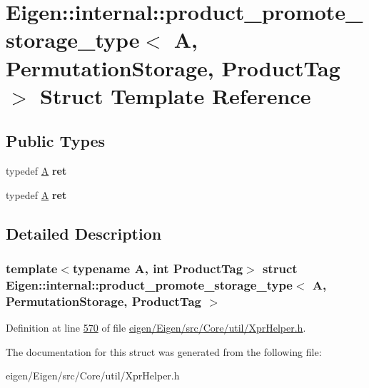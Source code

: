 \hypertarget{struct_eigen_1_1internal_1_1product__promote__storage__type_3_01_a_00_01_permutation_storage_00_01_product_tag_01_4}{}\section{Eigen\+:\+:internal\+:\+:product\+\_\+promote\+\_\+storage\+\_\+type$<$ A, Permutation\+Storage, Product\+Tag $>$ Struct Template Reference}
\label{struct_eigen_1_1internal_1_1product__promote__storage__type_3_01_a_00_01_permutation_storage_00_01_product_tag_01_4}
\subsection*{Public Types}
\begin{DoxyCompactItemize}
\item 
\mbox{\label{struct_eigen_1_1internal_1_1product__promote__storage__type_3_01_a_00_01_permutation_storage_00_01_product_tag_01_4_a01c2d9f17207b5b2a3bf0ed9826523a6}} 
typedef \hyperlink{group___core___module_class_eigen_1_1_matrix}{A} {\bfseries ret}
\item 
\mbox{\label{struct_eigen_1_1internal_1_1product__promote__storage__type_3_01_a_00_01_permutation_storage_00_01_product_tag_01_4_a01c2d9f17207b5b2a3bf0ed9826523a6}} 
typedef \hyperlink{group___core___module_class_eigen_1_1_matrix}{A} {\bfseries ret}
\end{DoxyCompactItemize}


\subsection{Detailed Description}
\subsubsection*{template$<$typename A, int Product\+Tag$>$\newline
struct Eigen\+::internal\+::product\+\_\+promote\+\_\+storage\+\_\+type$<$ A, Permutation\+Storage, Product\+Tag $>$}



Definition at line \hyperlink{eigen_2_eigen_2src_2_core_2util_2_xpr_helper_8h_source_l00570}{570} of file \hyperlink{eigen_2_eigen_2src_2_core_2util_2_xpr_helper_8h_source}{eigen/\+Eigen/src/\+Core/util/\+Xpr\+Helper.\+h}.



The documentation for this struct was generated from the following file\+:\begin{DoxyCompactItemize}
\item 
eigen/\+Eigen/src/\+Core/util/\+Xpr\+Helper.\+h\end{DoxyCompactItemize}
